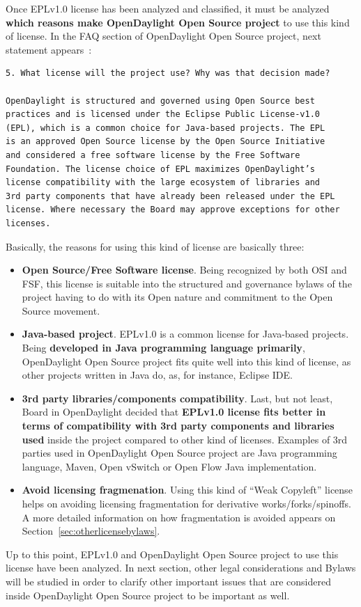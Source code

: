 \documentclass[a4paper, 12pt]{book}
\begin{document}
Once EPLv1.0 license has been analyzed and classified, it must be analyzed \textbf{which reasons make OpenDaylight Open Source project} to use this kind of license. In the FAQ section of OpenDaylight Open Source project, next statement appears~\cite{OpenDaylightFAQ5}:

\begin{verbatim}
5. What license will the project use? Why was that decision made?

OpenDaylight is structured and governed using Open Source best
practices and is licensed under the Eclipse Public License-v1.0
(EPL), which is a common choice for Java-based projects. The EPL
is an approved Open Source license by the Open Source Initiative
and considered a free software license by the Free Software
Foundation. The license choice of EPL maximizes OpenDaylight’s
license compatibility with the large ecosystem of libraries and
3rd party components that have already been released under the EPL
license. Where necessary the Board may approve exceptions for other
licenses.
\end{verbatim}
Basically, the reasons for using this kind of license are basically three:
\begin{itemize}
 \item{\textbf{Open Source/Free Software license}}. Being recognized by both OSI and FSF, this license is suitable into the structured and governance bylaws of the project having to do with its Open nature and commitment to the Open Source movement.
 \item{\textbf{Java-based project}}. EPLv1.0 is a common license for Java-based projects. Being \textbf{developed in Java programming language primarily}, OpenDaylight Open Source project fits quite well into this kind of license, as other projects written in Java do, as, for instance, Eclipse IDE.
 \item{\textbf{3rd party libraries/components compatibility}}. Last, but not least, Board in OpenDaylight decided that \textbf{EPLv1.0 license fits better in terms of compatibility with 3rd party components and libraries used} inside the project compared to other kind of licenses. Examples of 3rd parties used in OpenDaylight Open Source project are Java programming language, Maven, Open vSwitch or Open Flow Java implementation.
 \item{\textbf{Avoid licensing fragmenation}}. Using this kind of ``Weak Copyleft'' license helps on avoiding licensing fragmentation for derivative works/forks/spinoffs. A more detailed information on how fragmentation is avoided appears on Section~\ref{sec:otherlicensebylaws}.
\end{itemize}
Up to this point, EPLv1.0 and OpenDaylight Open Source project to use this license have been analyzed. In next section, other legal considerations and Bylaws will be studied in order to clarify other important issues that are considered inside OpenDaylight Open Source project to be important as well.
\end{document}
